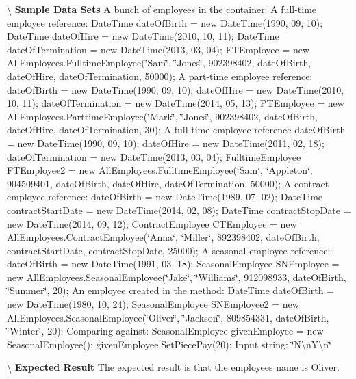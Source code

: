 \textbackslash{} {\bfseries  Sample Data Sets} A bunch of employees in the container\+: A full-\/time employee reference\+: Date\+Time date\+Of\+Birth = new Date\+Time(1990, 09, 10); Date\+Time date\+Of\+Hire = new Date\+Time(2010, 10, 11); Date\+Time date\+Of\+Termination = new Date\+Time(2013, 03, 04); F\+T\+Employee = new All\+Employees.\+Fulltime\+Employee(\char`\"{}\+Sam\char`\"{}, \char`\"{}\+Jones\char`\"{}, 902398402, date\+Of\+Birth, date\+Of\+Hire, date\+Of\+Termination, 50000); A part-\/time employee reference\+: date\+Of\+Birth = new Date\+Time(1990, 09, 10); date\+Of\+Hire = new Date\+Time(2010, 10, 11); date\+Of\+Termination = new Date\+Time(2014, 05, 13); P\+T\+Employee = new All\+Employees.\+Parttime\+Employee(\char`\"{}\+Mark\char`\"{}, \char`\"{}\+Jones\char`\"{}, 902398402, date\+Of\+Birth, date\+Of\+Hire, date\+Of\+Termination, 30); A full-\/time employee reference date\+Of\+Birth = new Date\+Time(1990, 09, 10); date\+Of\+Hire = new Date\+Time(2011, 02, 18); date\+Of\+Termination = new Date\+Time(2013, 03, 04); Fulltime\+Employee F\+T\+Employee2 = new All\+Employees.\+Fulltime\+Employee(\char`\"{}\+Sam\char`\"{}, \char`\"{}\+Appleton\char`\"{}, 904509401, date\+Of\+Birth, date\+Of\+Hire, date\+Of\+Termination, 50000); A contract employee reference\+: date\+Of\+Birth = new Date\+Time(1989, 07, 02); Date\+Time contract\+Start\+Date = new Date\+Time(2014, 02, 08); Date\+Time contract\+Stop\+Date = new Date\+Time(2014, 09, 12); Contract\+Employee C\+T\+Employee = new All\+Employees.\+Contract\+Employee(\char`\"{}\+Anna\char`\"{}, \char`\"{}\+Miller\char`\"{}, 892398402, date\+Of\+Birth, contract\+Start\+Date, contract\+Stop\+Date, 25000); A seasonal employee reference\+: date\+Of\+Birth = new Date\+Time(1991, 03, 18); Seasonal\+Employee S\+N\+Employee = new All\+Employees.\+Seasonal\+Employee(\char`\"{}\+Jake\char`\"{}, \char`\"{}\+Williams\char`\"{}, 912098933, date\+Of\+Birth, \char`\"{}\+Summer\char`\"{}, 20); An employee created in the method\+: Date\+Time date\+Of\+Birth = new Date\+Time(1980, 10, 24); Seasonal\+Employee S\+N\+Employee2 = new All\+Employees.\+Seasonal\+Employee(\char`\"{}\+Oliver\char`\"{}, \char`\"{}\+Jackson\char`\"{}, 809854331, date\+Of\+Birth, \char`\"{}\+Winter\char`\"{}, 20); Comparing against\+: Seasonal\+Employee given\+Employee = new Seasonal\+Employee(); given\+Employee.\+Set\+Piece\+Pay(20); Input string\+: \char`\"{}\+N\textbackslash{}n\+Y\textbackslash{}n\char`\"{}

\textbackslash{} {\bfseries  Expected Result} The expected result is that the employee\textquotesingle{}s name is Oliver.

